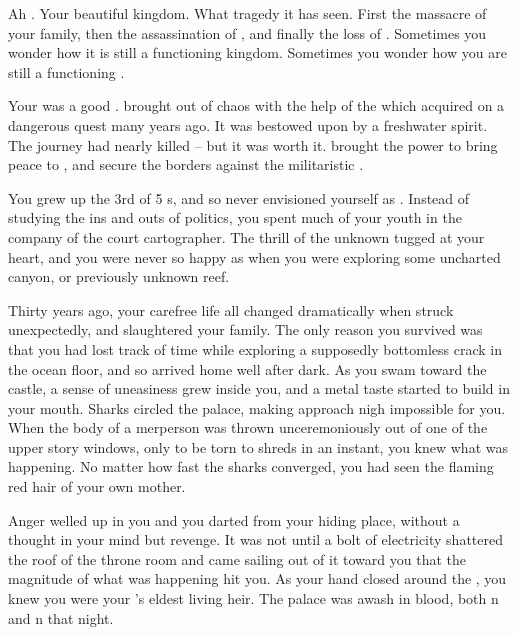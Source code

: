 \documentclass[char]{NeptuneBall}
\begin{document}
\name{\cKing{}}


Ah \pAtlantis{}. Your beautiful kingdom. What tragedy it has seen. First the massacre of your family, then the assassination of \cQueen{\King{}} \cQueen{}, and finally the loss of \cAriel{\Prince{}} \cAriel{}. Sometimes you wonder how it is still a functioning kingdom. Sometimes you wonder how you are still a functioning \cKing{\King{}}.

Your \cExKing{\parent{}} was a good \cExKing{\King{}}. \cExKing{\They{}} brought \pAtlantis{} out of chaos with the help of the \iTrident{\MYname{}} which \cExKing{\they{}} acquired on a dangerous quest many years ago. It was bestowed upon \cExKing{\them{}} by a freshwater spirit. The journey had nearly killed \cExKing{\them{}} -- but it was worth it. \iTrident{\MYname{}} brought \cExKing{} the power to bring peace to \pAtlantis{}, and secure the borders against the militaristic \pPacifica{}.

You grew up the 3rd of 5 \cKing{\offspring{}}s, and so never envisioned yourself as \cKing{\King{}}. Instead of studying the ins and outs of politics, you spent much of your youth in the company of the court cartographer. The thrill of the unknown tugged at your heart, and you were never so happy as when you were exploring some uncharted canyon, or previously unknown reef.

Thirty years ago, your carefree life all changed dramatically when \pPacifica{} struck unexpectedly, and slaughtered your family. The only reason you survived was that you had lost track of time while exploring a supposedly bottomless crack in the ocean floor, and so arrived home well after dark. As you swam toward the castle, a sense of uneasiness grew inside you, and a metal taste started to build in your mouth. Sharks circled the palace, making approach nigh impossible for you. When the body of a merperson was thrown unceremoniously out of one of the upper story windows, only to be torn to shreds in an instant, you knew what was happening. No matter how fast the sharks converged, you had seen the flaming red hair of your own mother.

Anger welled up in you and you darted from your hiding place, without a thought in your mind but revenge. It was not until a bolt of electricity shattered the roof of the throne room and \iTrident{\MYname{}} came sailing out of it toward you that the magnitude of what was happening hit you. As your hand closed around the \iTrident{\MYname{}}, you knew you were your \cExKing{\parent{}}'s eldest living heir. The palace was awash in blood, both \pPacifica{}n and \pAtlantis{}n that night. 
\end{document}

